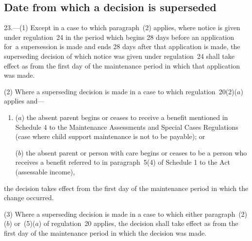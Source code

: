 \documentclass[a4paper,12pt]{article}
\begin{document}
\subsection[23. Date from which a decision is superseded]{Date from which a decision is superseded}

23.—(1) Except in a case to which paragraph~(2) applies, where notice is given under regulation~24 in the period which begins 28 days before an application for~a supersession is made and ends 28 days after that application is made, the superseding decision of which notice was given under regulation~24 shall take effect as from the first day of the maintenance period in which that application was made.


(2) Where a superseding decision is made in a case to which regulation~20(2)($a$)  applies and—
\begin{enumerate}\item[]
($a$) the absent parent begins or ceases to receive a benefit mentioned in Schedule 4 to the Maintenance Assessments and Special Cases Regulations (case where child support maintenance is not to be payable); or

($b$) the absent parent or person with care begins or ceases to be a person who receives a benefit referred to in paragraph~5(4) of Schedule 1 to the Act (assessable income),
\end{enumerate}
the decision takes effect from the first day of the maintenance period in which the change occurred.

(3) Where a superseding decision is made in a case to which either paragraph~(2)($b$) or~(5)($a$) of regulation~20 applies, the decision shall take effect as from the first day of the maintenance period in which the decision was made.
\end{document}
